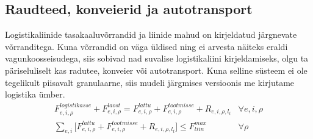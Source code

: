 \documentclass[10pt,a4paper]{article}
\begin{document}
\subsection{Raudteed, konveierid ja autotransport}
Logistikaliinide tasakaaluvõrrandid ja liinide mahud on kirjeldatud järgnevate võrranditega. Kuna võrrandid on väga üldised ning ei arvesta näiteks eraldi vagunkoosseisudega, siis sobivad nad suvalise logistikaliini kirjeldamiseks, olgu ta päriseluliselt kas radutee, konveier või autotransport. Kuna selline süsteem ei ole tegelikult piisavalt granulaarne, siis mudeli järgmises versioonis me kirjutame logistika ümber.
\begin{align}
F^{logistikasse}_{e,i,\rho} + F^{laost}_{e,i,\rho} =F^{lattu}_{e,i,\rho} + F^{tootmisse}_{e,i,\rho} + R_{e,i,\rho, l_t}  &\forall e, i, \rho \\
\sum_{e,i} \bigg[ F^{lattu}_{e,i,\rho} + F^{tootmisse}_{e,i,\rho} + R_{e,i,\rho, l_t} \bigg] \leq F^{max}_{liin} &\forall \rho 
\end{align}
\end{document}
